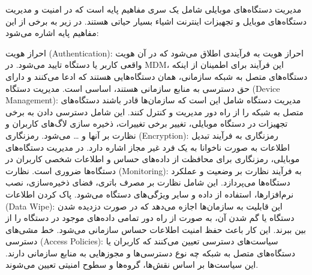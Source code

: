 



مدیریت دستگاه‌های موبایلی شامل یک سری مفاهیم پایه است که در امنیت و مدیریت دستگاه‌های موبایل و تجهیزات اینترنت اشیاء بسیار حیاتی هستند. در زیر به برخی از این مفاهیم پایه اشاره می‌شود:

احراز هویت (Authentication): احراز هویت به فرآیندی اطلاق می‌شود که در آن هویت واقعی کاربر یا دستگاه تایید می‌شود. در MDM، این فرآیند برای اطمینان از اینکه دستگاه‌های متصل به شبکه سازمانی، همان دستگاه‌هایی هستند که ادعا می‌کنند و دارای حق دسترسی به منابع سازمانی هستند، اساسی است.
مدیریت دستگاه (Device Management): مدیریت دستگاه شامل این است که سازمان‌ها قادر باشند دستگاه‌های متصل به شبکه را از راه دور مدیریت و کنترل کنند. این شامل دسترسی دادن به برخی تجهیزات در دستگاه موبایلی، تغییر برخی تغییرات، ذخیره سازی لاگ‌های کاربران و نظارت بر آنها و … می‌شود.
رمزنگاری (Encryption): رمزنگاری به فرآیند تبدیل اطلاعات به صورت ناخوانا به یک فرد غیر مجاز اشاره دارد. در مدیریت دستگاه‌های موبایلی، رمزنگاری برای محافظت از داده‌های حساس و اطلاعات شخصی کاربران در دستگاه‌ها ضروری است.
نظارت (Monitoring): به فرآیند نظارت بر وضعیت و عملکرد دستگاه‌ها می‌پردازد. این شامل نظارت بر مصرف باتری، فضای ذخیره‌سازی، نصب نرم‌افزارها، استفاده از داده و سایر ویژگی‌های دستگاه می‌شود.
پاک کردن اطلاعات (Data Wipe): این قابلیت به سازمان‌ها اجازه می‌دهد که در صورت دزدیده شدن دستگاه یا گم شدن آن، به صورت از راه دور تمامی داده‌های موجود در دستگاه را از بین ببرند. این کار باعث حفظ امنیت اطلاعات حساس سازمانی می‌شود.
خط مشی‌های دسترسی (Access Policies): سیاست‌های دسترسی تعیین می‌کنند که کاربران یا دستگاه‌های متصل به شبکه چه نوع دسترسی‌ها و مجوزهایی به منابع سازمانی دارند. این سیاست‌ها بر اساس نقش‌ها، گروه‌ها و سطوح امنیتی تعیین می‌شوند.





